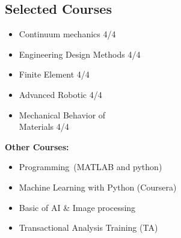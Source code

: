 \documentclass[
	a4paper,
]{ThirtyNinesecondscv}
\begin{document}
\subsection{Selected Courses}


\begin{multicols}{2}
	\begin{itemize}

	    \item Continuum mechanics 4/4
		\item Engineering Design Methods 4/4
		\item Finite Element 4/4
		\item 	Advanced Robotic  4/4
		\item Mechanical Behavior of \\Materials 4/4
			

		
       \end{itemize}
		\textbf{Other Courses:}
	{\footnotesize 	\begin{itemize}
		\item Programming~(MATLAB and python)
	   	\item Machine Learning with Python (Coursera)
		\item Basic of AI \& Image processing  
		\item Transactional Analysis Training (TA)
			
		\end{itemize}
			}	
\end{multicols}
\end{document}
